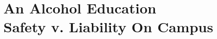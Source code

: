 

\def\thetitle{An Alcohol Education\\Safety v. Liability On Campus}
\def\shorttitle{An Alcohol Education}
\def\theauthors{\textit{Parting Thots} by Geoffrey Challen}
\def\shortauthors{Challen}


\pagestyle{document}
\thispagestyle{emptydocument}
\chapter{\thetitle}


